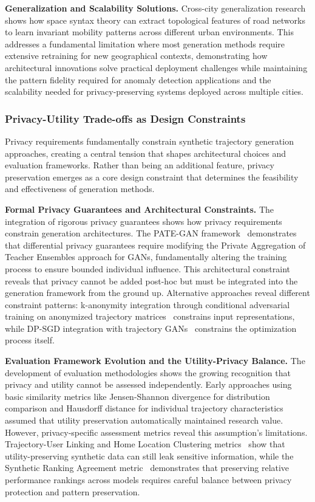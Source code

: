 \documentclass[runningheads]{llncs}
\begin{document}
\textbf{Generalization and Scalability Solutions.} Cross-city generalization research~\cite{wang2025gtg} shows how space syntax theory can extract topological features of road networks to learn invariant mobility patterns across different urban environments. This addresses a fundamental limitation where most generation methods require extensive retraining for new geographical contexts, demonstrating how architectural innovations solve practical deployment challenges while maintaining the pattern fidelity required for anomaly detection applications and the scalability needed for privacy-preserving systems deployed across multiple cities.

\subsubsection{Privacy-Utility Trade-offs as Design Constraints}

Privacy requirements fundamentally constrain synthetic trajectory generation approaches, creating a central tension that shapes architectural choices and evaluation frameworks. Rather than being an additional feature, privacy preservation emerges as a core design constraint that determines the feasibility and effectiveness of generation methods.

\textbf{Formal Privacy Guarantees and Architectural Constraints.} The integration of rigorous privacy guarantees shows how privacy requirements constrain generation architectures. The PATE-GAN framework~\cite{jordon2019pate} demonstrates that differential privacy guarantees require modifying the Private Aggregation of Teacher Ensembles approach for GANs, fundamentally altering the training process to ensure bounded individual influence. This architectural constraint reveals that privacy cannot be added post-hoc but must be integrated into the generation framework from the ground up. Alternative approaches reveal different constraint patterns: k-anonymity integration through conditional adversarial training on anonymized trajectory matrices~\cite{rao2023cats} constrains input representations, while DP-SGD integration with trajectory GANs~\cite{merhi2024synthetic} constrains the optimization process itself.

\textbf{Evaluation Framework Evolution and the Utility-Privacy Balance.} The development of evaluation methodologies shows the growing recognition that privacy and utility cannot be assessed independently. Early approaches using basic similarity metrics like Jensen-Shannon divergence for distribution comparison and Hausdorff distance for individual trajectory characteristics~\cite{kong2023mobility} assumed that utility preservation automatically maintained research value. However, privacy-specific assessment metrics reveal this assumption's limitations. Trajectory-User Linking and Home Location Clustering metrics~\cite{rao2023cats} show that utility-preserving synthetic data can still leak sensitive information, while the Synthetic Ranking Agreement metric~\cite{jordon2019pate} demonstrates that preserving relative performance rankings across models requires careful balance between privacy protection and pattern preservation.
\end{document}
